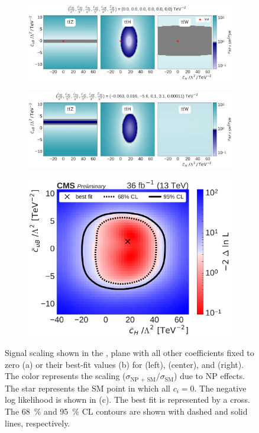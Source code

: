 \begin{figure}
  \vspace{-1cm}
  \begin{subfigure}{\linewidth}
    \centering
    \includegraphics[width=\linewidth]{figures/thirteen-TeV/scaling-frozen/cH_cuB}
    \caption{}
  \end{subfigure}
  \begin{subfigure}{\linewidth}
    \centering
    \includegraphics[width=\linewidth]{figures/thirteen-TeV/scaling/cH_cuB}
    \caption{}
  \end{subfigure}
  \begin{subfigure}{\linewidth}
    \centering
    \includegraphics[width=0.6\linewidth]{figures/thirteen-TeV/nll/cH_cuB}
    \caption{}
  \end{subfigure}
  \vspace{-1cm}
  \setlength{\capwidth}{15cm}
  \caption[Signal scaling and profile likelihood scan in the \cH, \cuB plane]{Signal scaling shown
  in the \cH, \cuB plane with all other coefficients fixed to zero (a) or their best-fit values (b)
  for \ttZ (left), \ttH (center), and \ttW (right). The color represents the scaling ($\sigma_\text{NP
  + SM} / \sigma_\text{SM}$) due to NP effects. The star represents the SM point in which all $c_i=0$.
  The negative log likelihood is shown in (c). The best fit is represented by a cross. The
  \SI{68}{\percent} and \SI{95}{\percent} CL contours are shown with dashed and solid lines,
  respectively.}
\end{figure}

